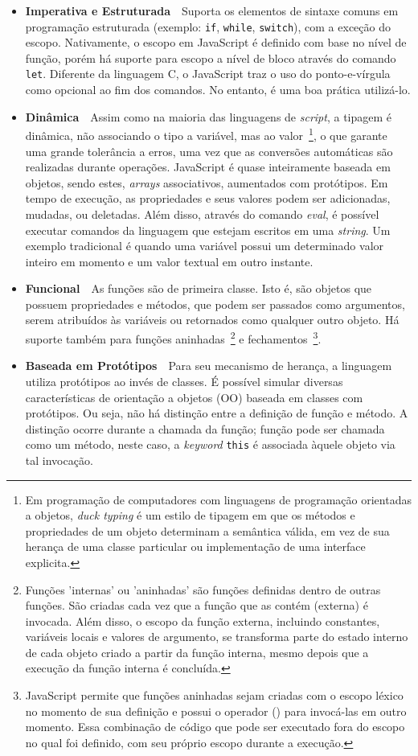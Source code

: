 \begin{itemize}
    \item \textbf{Imperativa e Estruturada}~\textemdash~Suporta os elementos de sintaxe comuns em programação estruturada (exemplo: \texttt{if}, \texttt{while}, \texttt{switch}), com a exceção do escopo. Nativamente, o escopo em JavaScript é definido com base no nível de função, porém há suporte para escopo a nível de bloco através do comando \texttt{let}. Diferente da linguagem C, o JavaScript traz o uso do ponto-e-vírgula como opcional ao fim dos comandos. No entanto, é uma boa prática utilizá-lo.
    \item \textbf{Dinâmica}~\textemdash~Assim como na maioria das linguagens de \textit{script}, a tipagem é dinâmica, não associando o tipo a variável, mas ao valor~\footnote{Em programação de computadores com linguagens de programação orientadas a objetos, \textit{duck typing} é um estilo de tipagem em que os métodos e propriedades de um objeto determinam a semântica válida, em vez de sua herança de uma classe particular ou implementação de uma interface explicita.}, o que garante uma grande tolerância a erros, uma vez que as conversões automáticas são realizadas durante operações. JavaScript é quase inteiramente baseada em objetos, sendo estes, \textit{arrays} associativos, aumentados com protótipos. Em tempo de execução, as propriedades e seus valores podem ser adicionadas, mudadas, ou deletadas. Além disso, através do comando \textit{eval}, é possível executar comandos da linguagem que estejam escritos em uma \textit{string}. Um exemplo tradicional é quando uma variável possui um determinado valor inteiro em momento e um valor textual em outro instante.
    \item \textbf{Funcional}~\textemdash~As funções são de primeira classe. Isto é, são objetos que possuem propriedades e métodos, que podem ser passados como argumentos, serem atribuídos às variáveis ou retornados como qualquer outro objeto. Há suporte também para funções aninhadas~\footnote{Funções 'internas' ou 'aninhadas' são funções definidas dentro de outras funções. São criadas cada vez que a função que as contém (externa) é invocada. Além disso, o escopo da função externa, incluindo constantes, variáveis locais e valores de argumento, se transforma parte do estado interno de cada objeto criado a partir da função interna, mesmo depois que a execução da função interna é concluída.} e fechamentos~\footnote{JavaScript permite que funções aninhadas sejam criadas com o escopo léxico no momento de sua definição e possui o operador () para invocá-las em outro momento. Essa combinação de código que pode ser executado fora do escopo no qual foi definido, com seu próprio escopo durante a execução.}.
    \item \textbf{Baseada em Protótipos}~\textemdash~Para seu mecanismo de herança, a linguagem utiliza protótipos ao invés de classes. É possível simular diversas características de orientação a objetos (OO) baseada em classes com protótipos. Ou seja, não há distinção entre a definição de função e método. A distinção ocorre durante a chamada da função; função pode ser chamada como um método, neste caso, a \textit{keyword} \texttt{this} é associada àquele objeto via tal invocação.
\end{itemize}

